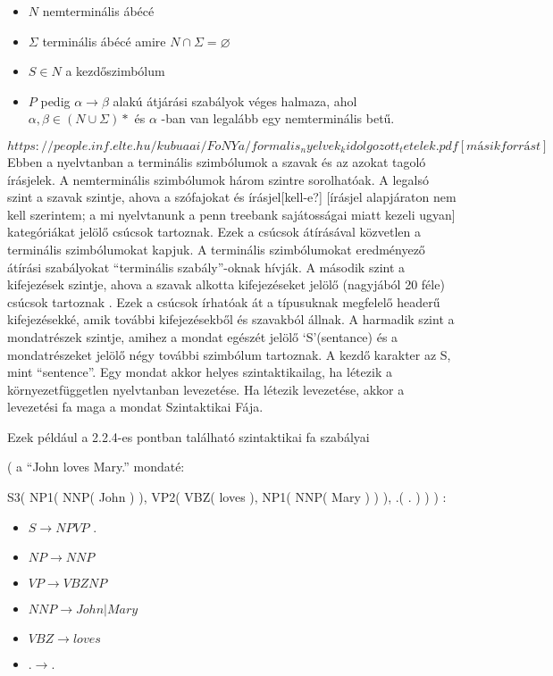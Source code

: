 \begin{itemize}
	\item \emph{$N$} nemterminális ábécé
	\item \emph{$\Sigma$} terminális ábécé amire $ N \cap \Sigma =\varnothing $
	\item \emph{$S\in N$} a kezdőszimbólum
	\item \emph{$P$} pedig $\alpha \to \beta$ alakú átjárási szabályok véges halmaza, ahol $\alpha,\beta \in(N \cup \Sigma)*$ és $\alpha$ -ban van legalább egy nemterminális betű.
\end{itemize}
$https://people.inf.elte.hu/kubuaai/FoNYa/formalis_nyelvek_kidolgozott_tetelek.pdf[ másik forrást]$
Ebben a nyelvtanban a terminális szimbólumok a szavak és az azokat tagoló írásjelek. A nemterminális szimbólumok három szintre sorolhatóak. A legalsó szint a szavak szintje, ahova a szófajokat és írásjel[kell-e?] [írásjel alapjáraton nem kell szerintem; a mi nyelvtanunk a penn treebank sajátosságai miatt kezeli ugyan] kategóriákat jelölő csúcsok tartoznak. Ezek a csúcsok átírásával közvetlen a terminális szimbólumokat kapjuk. A terminális szimbólumokat eredményező átírási szabályokat “terminális szabály”-oknak hívják. A második szint a kifejezések szintje, ahova a szavak alkotta kifejezéseket jelölő (nagyjából 20 féle) csúcsok tartoznak . Ezek a csúcsok írhatóak át a típusuknak megfelelő headerű kifejezésekké, amik további kifejezésekből és szavakból állnak. A harmadik szint a mondatrészek szintje, amihez a mondat egészét jelölő ‘S’(sentance) és a mondatrészeket jelölő négy további szimbólum tartoznak.  A kezdő karakter az S, mint “sentence”. Egy mondat akkor helyes szintaktikailag, ha létezik a környezetfüggetlen nyelvtanban levezetése. Ha létezik levezetése, akkor a levezetési fa maga a mondat Szintaktikai Fája.

Ezek például a 2.2.4-es pontban található szintaktikai fa szabályai

( a “John loves Mary.” mondaté: 

S3( NP1( NNP( John ) ), VP2( VBZ( loves ),  NP1( NNP( Mary ) ) ), .( . ) ) ) :
\begin{itemize}
\item$S \to NP VP$ .
\item$NP \to NNP$
\item$VP \to VBZ NP$
\item$NNP \to John | Mary$
\item$VBZ \to loves$
\item$. \to .$
\end{itemize}

